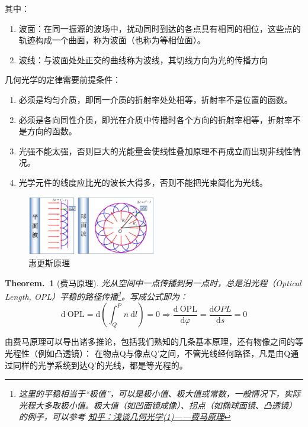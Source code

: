 \documentclass[UTF8]{report}
\theoremstyle{MyLineTheoremStyle} %
\theoremstyle{MyBlockTheoremStyle} %
\newtheorem{BlockTheorem}[LineTheorem]{Theorem.\,} %
\theoremstyle{MySubsubsectionStyle} %
\begin{document}
\noindent 其中：
\begin{enumerate}
    \item 波面：在同一振源的波场中，扰动同时到达的各点具有相同的相位，这些点的轨迹构成一个曲面，称为波面（也称为等相位面）。
    \item 波线：与波面处处正交的曲线称为波线，其切线方向为光的传播方向
\end{enumerate}

\noindent 几何光学的定律需要前提条件：
\begin{enumerate}
\item 必须是均匀介质，即同一介质的折射率处处相等，折射率不是位置的函数。
\item 必须是各向同性介质，即光在介质中传播时各个方向的折射率相等，折射率不是方向的函数。
\item 光强不能太强，否则巨大的光能量会使线性叠加原理不再成立而出现非线性情况。
\item 光学元件的线度应比光的波长大得多，否则不能把光束简化为光线。
\end{enumerate}

\begin{figure}[H]\centering
\includegraphics[width=0.5\textwidth]{assets/1,2/image (46).jpg}
\caption{惠更斯原理}\label{惠更斯原理}
\end{figure}

\begin{BlockTheorem}[费马原理]\label{费马原理}
光从空间中一点传播到另一点时，总是沿光程（Optical Length, OPL）平稳的路径传播\footnote{这里的平稳相当于“极值”，可以是极小值、极大值或常数，一般情况下，实际光程大多取极小值。极大值（如凹面镜成像）、拐点（如椭球面镜、凸透镜）的例子，可以参考 \href{https://zhuanlan.zhihu.com/p/107739173}{知乎：浅谈几何光学(1)——费马原理}}。写成公式即为：
\begin{equation}
    \mathrm{d}\ \mathrm{OPL} =  \mathrm{d}\left(\int_{Q}^{P} n \ \mathrm{d} l\right)=0 \Longrightarrow \frac{\mathrm{d}\  \mathrm{OPL} }{\mathrm{d} \varphi } = \frac{\mathrm{d} OPL }{\mathrm{d} s } = 0 
\end{equation}
\end{BlockTheorem}
由费马原理可以导出诸多推论，包括我们熟知的几条基本原理，还有物像之间的等光程性（例如凸透镜）：
在物点Q与像点Q’之间，不管光线经何路径，凡是由Q通过同样的光学系统到达Q’的光线，都是等光程的。
\end{document}
